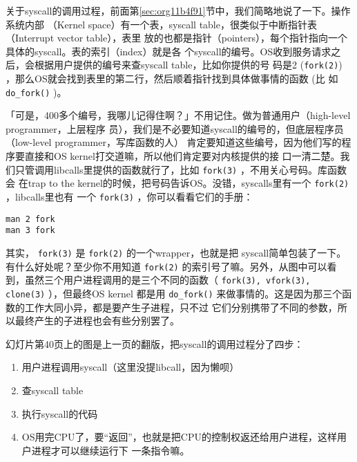 \documentclass{wx672ctexart}
\newcommand\mpic[1]{%
  \marginpar{\texttt{[image: thumbnails/\#1]}}}
\begin{document}
关于syscall的调用过程，前面第\ref{sec:org11b4f91}节中，我们简略地说了一下。操作系统内部
（Kernel space）有一个表，syscall table，很类似于中断指针表（Interrupt vector table），表里
放的也都是指针（pointers），每个指针指向一个具体的syscall。表的索引（index）就是各
个syscall的编号。OS收到服务请求之后，会根据用户提供的编号来查syscall table，比如你提供的号
码是2 (\texttt{fork(2)}) ，那么OS就会找到表里的第二行，然后顺着指针找到具体做事情的函数 (比
如 \texttt{do\_fork()} )。

「可是，400多个编号，我哪儿记得住啊？」不用记住。做为普通用户（high-level programmer，上层程序
员），我们是不必要知道syscall的编号的，但底层程序员（low-level programmer，写库函数的人）
肯定要知道这些编号，因为他们写的程序要直接和OS kernel打交道嘛，所以他们肯定要对内核提供的接
口一清二楚。我们只管调用libcalls里提供的函数就行了，比如 \texttt{fork(3)} ，不用关心号码。库函数会
在trap to the kernel的时候，把号码告诉OS。没错，syscalls里有一个 \texttt{fork(2)} ，libcalls里也有
一个 \texttt{fork(3)} ，你可以看看它们的手册：
\begin{verbatim}
man 2 fork
man 3 fork
\end{verbatim}

其实， \texttt{fork(3)} 是 \texttt{fork(2)} 的一个wrapper，也就是把
syscall简单包装了一下。有什么好处呢？至少你不用知道 \texttt{fork(2)} 的索引号了嘛。另外，从图中可以看
到，虽然三个用户进程调用的是三个不同的函数（ \texttt{fork(3), vfork(3), clone(3)} ），但最终OS kernel
都是用 \texttt{do\_fork()} 来做事情的。这是因为那三个函数的工作大同小异，都是要产生子进程，只不过
它们分别携带了不同的参数，所以最终产生的子进程也会有些分别罢了。

\mpic{pg_0040}幻灯片第40页上的图是上一页的翻版，把syscall的调用过程分了四步：
\begin{enumerate}
\item 用户进程调用syscall（这里没提libcall，因为懒呗）
\item 查syscall table
\item 执行syscall的代码
\item OS用完CPU了，要“返回”，也就是把CPU的控制权返还给用户进程，这样用户进程才可以继续运行下
一条指令嘛。
\end{enumerate}
\end{document}
